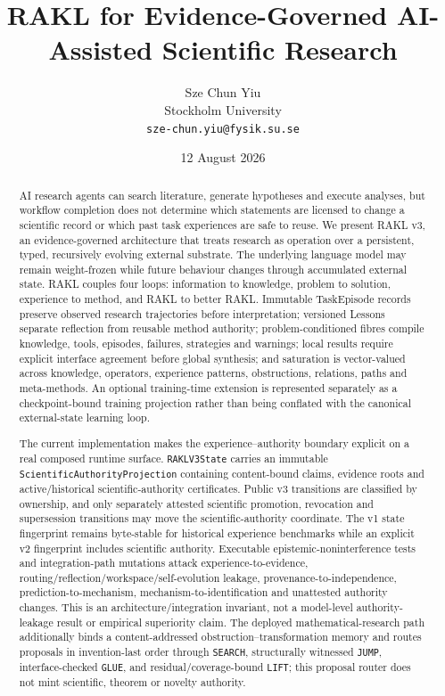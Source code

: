 \documentclass[11pt]{article}
\title{RAKL for Evidence-Governed AI-Assisted Scientific Research}
\author{Sze Chun Yiu\\Stockholm University\\\texttt{sze-chun.yiu@fysik.su.se}}
\date{12 August 2026}
\begin{document}
\maketitle

\begin{abstract}
AI research agents can search literature, generate hypotheses and execute analyses, but workflow completion does not determine which statements are licensed to change a scientific record or which past task experiences are safe to reuse. We present RAKL v3, an evidence-governed architecture that treats research as operation over a persistent, typed, recursively evolving external substrate. The underlying language model may remain weight-frozen while future behaviour changes through accumulated external state. RAKL couples four loops: information to knowledge, problem to solution, experience to method, and RAKL to better RAKL. Immutable TaskEpisode records preserve observed research trajectories before interpretation; versioned Lessons separate reflection from reusable method authority; problem-conditioned fibres compile knowledge, tools, episodes, failures, strategies and warnings; local results require explicit interface agreement before global synthesis; and saturation is vector-valued across knowledge, operators, experience patterns, obstructions, relations, paths and meta-methods. An optional training-time extension is represented separately as a checkpoint-bound training projection rather than being conflated with the canonical external-state learning loop.

The current implementation makes the experience--authority boundary explicit on a real composed runtime surface. \texttt{RAKLV3State} carries an immutable \texttt{ScientificAuthorityProjection} containing content-bound claims, evidence roots and active/historical scientific-authority certificates. Public v3 transitions are classified by ownership, and only separately attested scientific promotion, revocation and supersession transitions may move the scientific-authority coordinate. The v1 state fingerprint remains byte-stable for historical experience benchmarks while an explicit v2 fingerprint includes scientific authority. Executable epistemic-noninterference tests and integration-path mutations attack experience-to-evidence, routing/reflection/workspace/self-evolution leakage, provenance-to-independence, prediction-to-mechanism, mechanism-to-identification and unattested authority changes. This is an architecture/integration invariant, not a model-level authority-leakage result or empirical superiority claim. The deployed mathematical-research path additionally binds a content-addressed obstruction--transformation memory and routes proposals in invention-last order through \texttt{SEARCH}, structurally witnessed \texttt{JUMP}, interface-checked \texttt{GLUE}, and residual/coverage-bound \texttt{LIFT}; this proposal router does not mint scientific, theorem or novelty authority.


\end{abstract}
\end{document}

